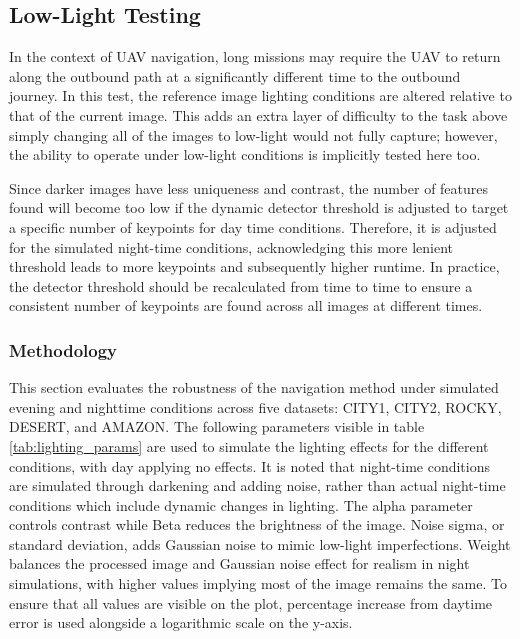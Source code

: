 \subsection{Low-Light Testing}

In the context of UAV navigation, long missions may require the UAV to return along the outbound path at a significantly different time to the outbound journey. In this test, the reference image lighting conditions are altered relative to that of the current image. This adds an extra layer of difficulty to the task above simply changing all of the images to low-light would not fully capture; however, the ability to operate under low-light conditions is implicitly tested here too. 

Since darker images have less uniqueness and contrast, the number of features found will become too low if the dynamic detector threshold is adjusted to target a specific number of keypoints for day time conditions. Therefore, it is adjusted for the simulated night-time conditions, acknowledging this more lenient threshold leads to more keypoints and subsequently higher runtime. In practice, the detector threshold should be recalculated from time to time to ensure a consistent number of keypoints are found across all images at different times. 


\subsubsection{Methodology}

This section evaluates the robustness of the navigation method under simulated evening and nighttime conditions across five datasets: CITY1, CITY2, ROCKY, DESERT, and AMAZON. The following parameters visible in table \ref{tab:lighting_params} are used to simulate the lighting effects for the different conditions, with day applying no effects. It is noted that night-time conditions are simulated through darkening and adding noise, rather than actual night-time conditions which include dynamic changes in lighting. The alpha parameter controls contrast while Beta reduces the brightness of the image. Noise sigma, or standard deviation, adds Gaussian noise to mimic low-light imperfections. Weight balances the processed image and Gaussian noise effect for realism in night simulations, with higher values implying most of the image remains the same. To ensure that all values are visible on the plot, percentage increase from daytime error is used alongside a logarithmic scale on the y-axis. 

